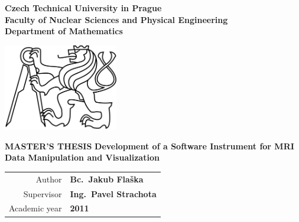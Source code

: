 \documentclass[a4paper,12pt]{report}	%
\newcommand{\cvut}{Czech Technical University in Prague}
\newcommand{\fjfi}{Faculty of Nuclear Sciences and Physical Engineering}
\newcommand{\km}{Department of Mathematics}
\newcommand{\nazeven}{Development of a Software Instrument for MRI Data Manipulation and Visualization }
\newcommand{\autor}{Bc.~Jakub Flaška}
\newcommand{\rok}{2011}
\newcommand{\vedouci}{Ing.~Pavel Strachota}
\begin{document}
\thispagestyle{empty}

\begin{center}
	{\fontsize{15}{15.5} \bf \cvut\\[2mm] \fjfi \\[2mm] \km}	%
	\vfill
		\begin{center}
			\includegraphics[width=50mm]{Text/IMG/00_Logo_CVUT_bw.jpg}	%
		\end{center}
	\vfill
		{\fontsize{35}{36.5} \bf MASTER'S THESIS}		%
	\vfill			
		{\fontsize{20}{20.5} \bf \nazeven}	%
	\vfill	
		{\large %
			\begin{tabular}{rl}
				Author 		& {\bf	\autor}			\\					%
				Supervisor 	& {\bf	\vedouci }		\\					%
				Academic year		& {\bf	\rok }			\\					%
			\end{tabular}
		}
\end{center}

\newpage
\thispagestyle{empty}
\end{document}
